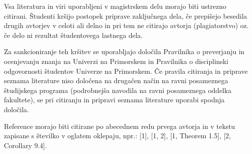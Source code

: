 Vsa literatura in viri uporabljeni v magistrskem delu morajo biti ustrezno citirani. Študenti kršijo postopek priprave zaključnega dela, če prepišejo besedila drugih avtorjev v celoti ali delno in pri tem ne citirajo avtorja (plagiatorstvo) oz. če delo ni rezultat študentovega lastnega dela.

Za sankcioniranje teh kršitev se uporabljajo določila Pravilnika o preverjanju in ocenjevanju znanja na Univerzi na Primorskem in Pravilnika o disciplinski odgovornosti študentov Univerze na Primorskem. Če pravila citiranja in priprave seznama literature niso določena na drugačen način na ravni posameznega študijskega programa (podrobnejša navodila na ravni posameznega oddelka fakultete), se pri citiranju in pripravi seznama literature uporabi spodnja določila.

Reference morajo biti citirane po abecednem redu prvega avtorja in v tekstu zapisane s številko v oglatem oklepaju, npr.: [1], [1, 2], [1, Theorem 1.5], [2, Corollary 9.4].